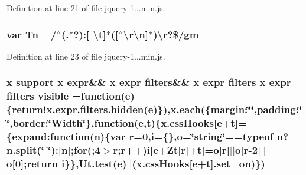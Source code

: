 Definition at line 21 of file jquery-\/1...\+min.\+js.

\hypertarget{obj_2_release_2_package_2_package_tmp_2_scripts_2jquery-1_810_82_8min_8js_a2a743fa90b7bc233019c5b720ccde5cc}{}
\subsubsection[{Tn}]{\setlength{\rightskip}{0pt plus 5cm}var Tn =/$^\wedge$(.$\ast$?)\+:\mbox{[} \textbackslash{}{\bf t}\mbox{]}$\ast$(\mbox{[}$^\wedge$\textbackslash{}r\textbackslash{}n\mbox{]}$\ast$)\textbackslash{}r?\$/gm}\label{obj_2_release_2_package_2_package_tmp_2_scripts_2jquery-1_810_82_8min_8js_a2a743fa90b7bc233019c5b720ccde5cc}


Definition at line 23 of file jquery-\/1...\+min.\+js.

\hypertarget{obj_2_release_2_package_2_package_tmp_2_scripts_2jquery-1_810_82_8min_8js_a52992524aa1f4d01d5c9f1b9a15c35f5}{}
\subsubsection[{visible}]{ {\bf x} support {\bf x} expr\&\& {\bf x} expr filters\&\& {\bf x} expr filters {\bf x} expr filters visible =function({\bf e})\{{\bf return!x.\+expr.\+filters.\+hidden}({\bf e})\}),{\bf x.\+each}(\{margin\+:\char`\"{}\char`\"{},padding\+:\char`\"{}\char`\"{},border\+:\char`\"{}Width\char`\"{}\},function({\bf e},{\bf t})\{x.\+css\+Hooks\mbox{[}{\bf e}+{\bf t}\mbox{]}=\{expand\+:function(n)\{var r=0,{\bf i}=\{\},{\bf o}=\char`\"{}string\char`\"{}==typeof n?n.\+split(\char`\"{} \char`\"{})\+:\mbox{[}n\mbox{]};for(;4$>$r;r++){\bf i}\mbox{[}{\bf e}+Zt\mbox{[}r\mbox{]}+{\bf t}\mbox{]}={\bf o}\mbox{[}r\mbox{]}$\vert$$\vert${\bf o}\mbox{[}r-\/2\mbox{]}$\vert$$\vert${\bf o}\mbox{[}0\mbox{]};return {\bf i}\}\},Ut.\+test({\bf e})$\vert$$\vert$(x.\+css\+Hooks\mbox{[}{\bf e}+{\bf t}\mbox{]}.set={\bf on})\})}\label{obj_2_release_2_package_2_package_tmp_2_scripts_2jquery-1_810_82_8min_8js_a52992524aa1f4d01d5c9f1b9a15c35f5}


